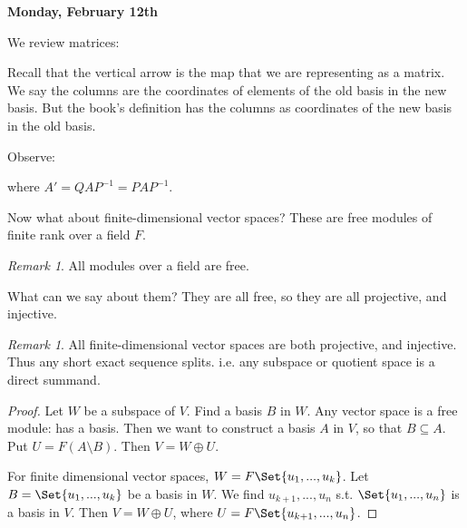 \documentclass[9pt,reqno,twoside]{amsbook}
\theoremstyle{plain}
\numberwithin{section}{chapter}
\numberwithin{equation}{chapter}
\theoremstyle{definition}
\theoremstyle{remark}
\newtheorem{rem}[theorem]{Remark}
\theoremstyle{plain}
\newcommand{\sub}{\subseteq}
\renewcommand{\phi}{\varphi}
\begin{document}
\textbf{Monday, February 12th}

We review matrices: 
\begin{center}
\end{center}
Recall that the vertical arrow is the map that we are representing as a matrix. We say the columns are the coordinates of elements of the old basis in the new basis. But the book's definition has the columns as coordinates of the new basis in the old basis. 

Observe: 
\begin{center}
\end{center}
where $A' = QAP^{-1} = PAP^{-1}$. 

Now what about finite-dimensional vector spaces? These are free modules of finite rank over a field $F$. 
\begin{rem}
All modules over a field are free. 
\end{rem}

What can we say about them? They are all free, so they are all projective, and injective. 

\begin{rem}
All finite-dimensional vector spaces are both projective, and injective. Thus any short exact sequence splits. i.e. any subspace or quotient space is a direct summand. 
\end{rem}

\begin{proof}
Let $W$ be a subspace of $V$. Find a basis $B$ in $W$. Any vector space is a free module: has a basis. Then we want to construct a basis $A$ in $V$, so that $B \sub A$. Put $U = F(A \setminus B)$. Then $V  = W \oplus U$. 

For finite dimensional vector spaces, $W = F\Set{u_1,...,u_k}$. Let $B = \Set{u_1,...,u_k}$ be a basis in $W$. We find $u_{k + 1},...,u_n$ s.t. $\Set{u_1,...,u_n}$ is a basis in $V$. Then $V = W \oplus U$, where $U = F\Set{u_{k + 1},...,u_n}$. 
\end{proof}
\end{document}
